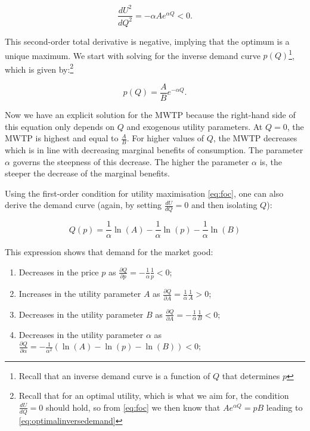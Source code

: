 \documentclass[
]{book}
\providecommand{\tightlist}{%
  \setlength{\itemsep}{0pt}\setlength{\parskip}{0pt}}
\begin{document}
\begin{equation}
\frac{dU^2}{dQ^2} = -\alpha Ae^{\alpha Q} < 0.
\end{equation}

This second-order total derivative is negative, implying that the optimum is a unique maximum. We start with solving for the inverse demand curve \(p(Q)\)\footnote{Recall that an inverse demand curve is a function of \(Q\) that determines \(p\)}, which is given by:\footnote{Recall that for an optimal utility, which is what we aim for, the condition \(\frac{dU}{dQ} = 0\) should hold, so from \eqref{eq:foc} we then know that \(Ae^{\alpha Q} = pB\) leading to \eqref{eq:optimalinversedemand}}

\begin{equation}
p(Q)=\frac{A}{B} e^{-\alpha Q}.
\label{eq:optimalinversedemand}
\end{equation}

Now we have an explicit solution for the MWTP because the right-hand side of this equation only depends on \(Q\) and exogenous utility parameters. At \(Q=0\), the MWTP is highest and equal to \(\frac{A}{B}\). For higher values of \(Q\), the MWTP decreases which is in line with decreasing marginal benefits of consumption. The parameter \(\alpha\) governs the steepness of this decrease. The higher the parameter \(\alpha\) is, the steeper the decrease of the marginal benefits.

Using the first-order condition for utility maximisation \eqref{eq:foc}, one can also derive the demand curve (again, by setting \(\frac{dU}{dQ} = 0\) and then isolating \(Q\)):

\begin{equation}
Q(p)=\frac{1}{\alpha}\ln(A) - \frac{1}{\alpha}\ln(p) - \frac{1}{\alpha}\ln(B)  
\end{equation}

This expression shows that demand for the market good:

\begin{enumerate}
\def\labelenumi{\arabic{enumi}.}
\tightlist
\item
  Decreases in the price \(p\) as \(\frac{\partial Q}{\partial p} =-\frac{1}{\alpha}\frac{1}{p}<0\);
\item
  Increases in the utility parameter \(A\) as \(\frac{\partial Q}{\partial A} =\frac{1}{\alpha} \frac{1}{A} >0\);
\item
  Decreases in the utility parameter \(B\) as \(\frac{\partial Q}{\partial A} =-\frac{1}{\alpha} \frac{1}{B} <0\);
\item
  Decreases in the utility parameter \(\alpha\) as \(\frac{\partial Q}{\partial \alpha} =-\frac{1}{\alpha^2} \left( \ln(A) - \ln(p) - \ln (B) \right) <0\);
\end{enumerate}
\end{document}
